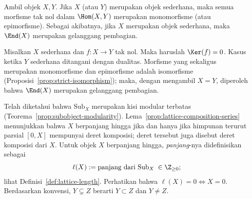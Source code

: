 \begin{lema}
    Ambil objek $X,Y$. Jika $X$ (atau $Y$) merupakan objek sederhana, maka
semua morfisme tak nol dalam $\Hom(X,Y)$ merupakan monomorfisme (atau
epimorfisme). Sebagai akibatnya, jika $X$ merupakan objek sederhana, maka
$\End(X)$ merupakan gelanggang pembagian.
\end{lema}
\begin{bukti}
    Misalkan $X$ sederhana dan $f:X\to Y$ tak nol. Maka haruslah
$\Ker(f)=0$. Kasus ketika $Y$ sederhana ditangani dengan dualitas. Morfisme
yang sekaligus merupakan monomorfisme dan epimorfisme adalah isomorfisme
(Proposisi~\ref{prop:strict-isomorphism}); maka, dengan mengambil $X=Y$,
diperoleh bahwa $\End(X)$ merupakan gelanggang pembagian.
\end{bukti}

Telah diketahui bahwa $\mathrm{Sub}_X$ merupakan kisi modular terbatas
(Teorema~\ref{prop:subobject-modularity}). Lema~\ref{prop:lattice-composition-series}
menunjukkan bahwa $X$ berpanjang hingga jika dan hanya jika himpunan terurut
parsial $[0,X]$ mempunyai deret komposisi; deret tersebut juga disebut
deret komposisi dari $X$. Untuk objek $X$ berpanjang hingga, \emph{panjang}-nya
didefinisikan sebagai 
\[ \ell(X) := \text{panjang dari }\mathrm{Sub}_X\;\in \Z_{\geq 0}; \]
lihat Definisi~\ref{def:lattice-length}. Perhatikan bahwa
$\ell(X)=0\iff X=0$. Berdasarkan konvensi, $Y\subsetneq Z$ berarti
$Y\subset Z$ dan $Y\neq Z$.

